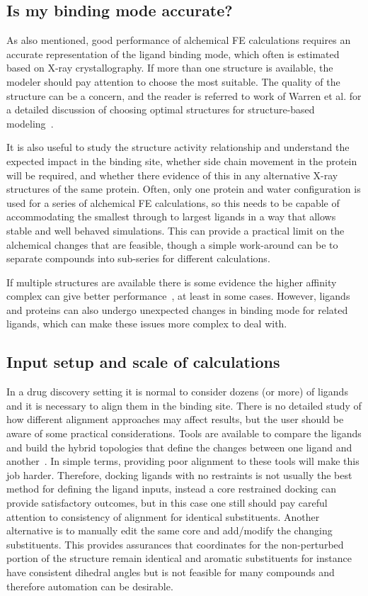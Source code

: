 \documentclass[9pt,bestpractices]{livecoms}
\begin{document}
\subsection{Is my binding mode accurate?}
As also mentioned, good performance of alchemical FE calculations requires an accurate representation of the ligand binding mode, which often is estimated based on X-ray crystallography. If more than one structure is available, the modeler should pay attention to choose the most suitable. The quality of the structure can be a concern, and the reader is referred to work of Warren et al. for a detailed discussion of choosing optimal structures for structure-based modeling~\cite{warren2012essential}. 

It is also useful to study the structure activity relationship and understand the expected impact in the binding site, whether side chain movement in the protein will be required, and whether there evidence of this in any alternative X-ray structures of the same protein. Often, only one protein and water configuration is used for a series of alchemical FE calculations, so this needs to be capable of accommodating the smallest through to largest ligands in a way that allows stable and well behaved simulations. This can provide a practical limit on the alchemical changes that are feasible, though a simple work-around can be to separate compounds into sub-series for different calculations. 

If multiple structures are available there is some evidence the higher affinity complex can give better performance~\cite{perez-benito2019predicting}, at least in some cases. However, ligands and proteins can also undergo unexpected changes in binding mode for related ligands, which can make these issues more complex to deal with.

\subsection{Input setup and scale of calculations}
In a drug discovery setting it is normal to consider dozens (or more) of ligands and it is necessary to align them in the binding site. There is no detailed study of how different alignment approaches may affect results, but the user should be aware of some practical considerations. Tools are available to compare the ligands and build the hybrid topologies that define the changes between one ligand and another~\cite{loeffler2015fesetup,hedges2019biosimspace,gapsys2015pmx}. In simple terms, providing poor alignment to these tools will make this job harder. Therefore, docking ligands with no restraints is not usually the best method for defining the ligand inputs, instead a core restrained docking can provide satisfactory outcomes, but in this case one still should pay careful attention to consistency of alignment for identical substituents. Another alternative is to manually edit the same core and add/modify the changing substituents. This provides assurances that coordinates for the non-perturbed portion of the structure  remain identical and aromatic substituents for instance have consistent dihedral angles but is not feasible for many compounds and therefore automation can be desirable. 
\end{document}
